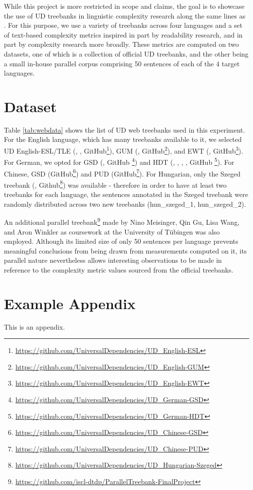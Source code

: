\documentclass[11pt]{article}
\begin{document}
While this project is more restricted in scope and claims, the goal is to showcase the use of UD treebanks in linguistic complexity research along the same lines as \citealp{Cagri:18}. For this purpose, we use a variety of treebanks across four languages and a set of text-based complexity metrics inspired in part by readability research, and in part by complexity research more broadly. These metrics are computed on two datasets, one of which is a collection of official UD treebanks, and the other being a small in-house parallel corpus comprising 50 sentences of each of the 4 target languages.

\section{Dataset}




Table \ref{tab:webdata} shows the list of UD web treebanks used in this experiment. For the English language, which has many treebanks available to it, we selected UD English-ESL/TLE (\citealp{berzak2016tle}, \citealp{yannakoudakis2011fce}, GitHub\footnote{\url{https://github.com/UniversalDependencies/UD_English-ESL}}), GUM (\citealp{berzak2016tle}, GitHub\footnote{\url{https://github.com/UniversalDependencies/UD_English-GUM}}), and EWT (\citealp{silveira14gold}, GitHub\footnote{\url{https://github.com/UniversalDependencies/UD_English-EWT}}). For German, we opted for GSD (\citealp{mcdonald-etal-2013-universal}, GitHub \footnote{\url{https://github.com/UniversalDependencies/UD_German-GSD}}) and HDT (\citealp{borges-volker-etal-2019-hdt}, \citealp{hennig-kohn-2017-dependency}, \citealp{hdtextra}, \citealp{hdtguide}, GitHub \footnote{\url{https://github.com/UniversalDependencies/UD_German-HDT}}). For Chinese, 
GSD (GitHub\footnote{\url{https://github.com/UniversalDependencies/UD_Chinese-GSD}}) and PUD (GitHub\footnote{\url{https://github.com/UniversalDependencies/UD_Chinese-PUD}}). For Hungarian, only the Szeged treebank (\citealp{szeged}, Github\footnote{\url{https://github.com/UniversalDependencies/UD_Hungarian-Szeged}}) was available - therefore in order to have at least two treebanks for each language, the sentences annotated in the Szeged treebank were randomly distributed across two new treebanks (hun\_szeged\_1, hun\_szeged\_2).

An additional parallel treebank\footnote{\url{https://github.com/iscl-dtdp/ParallelTreebank-FinalProject}} made by Nino Meisinger, Qin Gu, Lisa Wang, and Aron Winkler as coursework at the University of Tübingen was also employed. Although its limited size of only 50 sentences per language prevents meaningful conclusions from being drawn from measurements computed on it, its parallel nature nevertheless allows interesting observations to be made in reference to the complexity metric values sourced from the official treebanks. 




\appendix

\section{Example Appendix}
\label{sec:appendix}

This is an appendix.
\end{document}
